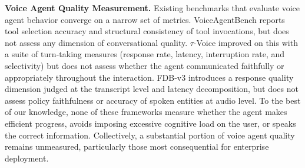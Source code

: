 \textbf{Voice Agent Quality Measurement.} Existing benchmarks that evaluate voice agent behavior converge on a narrow set of metrics. VoiceAgentBench \citep{jain2025voiceagentbench} reports tool selection accuracy and structural consistency of tool invocations, but does not assess any dimension of conversational quality. $\tau$-Voice \citep{ray2026tauvoicebenchmarkingfullduplexvoice} improved on this with a suite of turn-taking measures (response rate, latency, interruption rate, and selectivity) but does not assess whether the agent communicated faithfully or appropriately throughout the interaction. FDB-v3 \citep{lin2026full} introduces a response quality dimension judged at the transcript level and latency decomposition, but does not assess policy faithfulness or accuracy of spoken entities at audio level. To the best of our knowledge, none of these frameworks measure whether the agent makes efficient progress, avoids imposing excessive cognitive load on the user, or speaks the correct information. Collectively, a substantial portion of voice agent quality remains unmeasured, particularly those most consequential for enterprise deployment.
